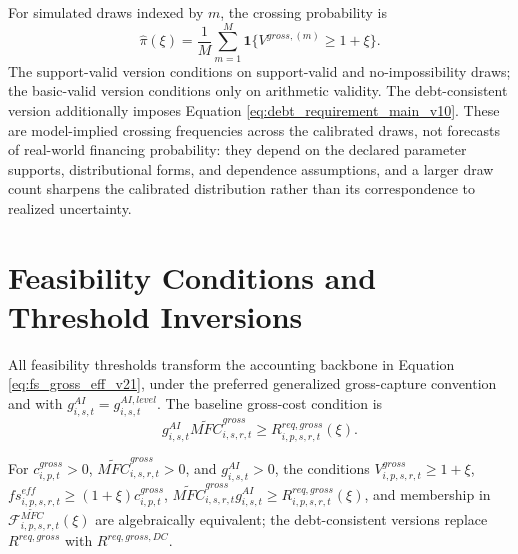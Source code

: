 \documentclass[11pt,a4paper]{article}
\begin{document}
For simulated draws indexed by $m$, the crossing probability is
\begin{equation}\label{eq:mc_prob_main_v10}
    \widehat{\pi}(\xi)=\frac{1}{M}\sum_{m=1}^{M}\mathbf{1}\{V^{gross,(m)}\geq1+\xi\}.
\end{equation}
The support-valid version conditions on support-valid and no-impossibility draws; the basic-valid version conditions only on arithmetic validity. The debt-consistent version additionally imposes Equation \eqref{eq:debt_requirement_main_v10}. These are model-implied crossing frequencies across the calibrated draws, not forecasts of real-world financing probability: they depend on the declared parameter supports, distributional forms, and dependence assumptions, and a larger draw count sharpens the calibrated distribution rather than its correspondence to realized uncertainty.


\section{Feasibility Conditions and Threshold Inversions}\label{sec:theory}

All feasibility thresholds transform the accounting backbone in Equation \eqref{eq:fs_gross_eff_v21}, under the preferred generalized gross-capture convention and with $g^{AI}_{i,s,t}=g^{AI,level}_{i,s,t}$. The baseline gross-cost condition is
\begin{equation}\label{eq:backbone_inequality_v17}
    g^{AI}_{i,s,t}\widetilde{MFC}^{gross}_{i,s,r,t}\geq R^{req,gross}_{i,p,s,r,t}(\xi).
\end{equation}

For $c^{gross}_{i,p,t}>0$, $\widetilde{MFC}^{gross}_{i,s,r,t}>0$, and $g^{AI}_{i,s,t}>0$, the conditions $V^{gross}_{i,p,s,r,t}\geq1+\xi$, $fs^{eff}_{i,p,s,r,t}\geq(1+\xi)c^{gross}_{i,p,t}$, $\widetilde{MFC}^{gross}_{i,s,r,t}g^{AI}_{i,s,t}\geq R^{req,gross}_{i,p,s,r,t}(\xi)$, and membership in $\mathcal{F}^{\widetilde{MFC}}_{i,p,s,r,t}(\xi)$ are algebraically equivalent; the debt-consistent versions replace $R^{req,gross}$ with $R^{req,gross,DC}$.
\end{document}
